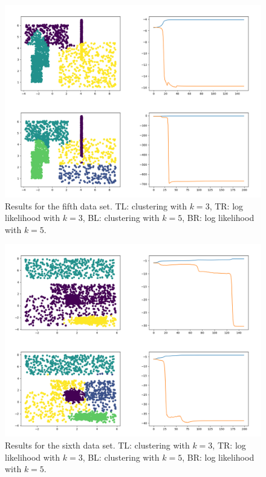 \documentclass{article}
\begin{document}
\begin{figure}[!ht]
	\centering
	\includegraphics[width=120mm]{figs/gmm_ds4_orthog_plt_ll.png}
	\caption{Results for the fifth data set. TL: clustering with $k = 3$, TR: log likelihood with $k = 3$, BL: clustering with $k = 5$, BR: log likelihood with $k = 5$.}
\end{figure}

\begin{figure}[!ht]
	\centering
	\includegraphics[width=120mm]{figs/gmm_ds5_orthog_plt_ll.png}
	\caption{Results for the sixth data set. TL: clustering with $k = 3$, TR: log likelihood with $k = 3$, BL: clustering with $k = 5$, BR: log likelihood with $k = 5$.}
\end{figure}
\end{document}
